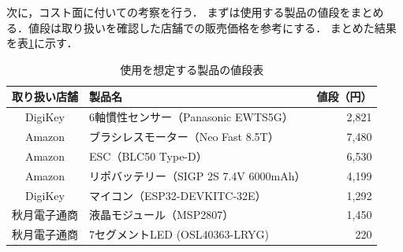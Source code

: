 \documentclass[uplatex,dvipdfmx]{jsarticle}
\begin{document}




次に，コスト面に付いての考察を行う．
まずは使用する製品の値段をまとめる．値段は取り扱いを確認した店舗での販売価格を参考にする．
まとめた結果を表\ref{table:Price}に示す．

\begin{table}[h]
  \centering
  \caption{使用を想定する製品の値段表}
  \label{table:Price}
  \begin{tabular}{clr}
\hline
取り扱い店舗 & 製品名 & 値段（円） \\\hline \hline
DigiKey & 6軸慣性センサー（Panasonic EWTS5G） & 2,821 \\\hline
Amazon & ブラシレスモーター（Neo Fast 8.5T） & 7,480 \\\hline
Amazon & ESC（BLC50 Type-D） & 6,530  \\\hline
Amazon & リポバッテリー（SIGP 2S 7.4V 6000mAh） & 4,199 \\\hline
DigiKey & マイコン（ESP32-DEVKITC-32E） & 1,292 \\\hline
秋月電子通商 & 液晶モジュール（MSP2807） & 1,450 \\\hline
秋月電子通商 & 7セグメントLED (OSL40363-LRYG) & 220 \\\hline
  \end{tabular}
\end{table}
\end{document}
